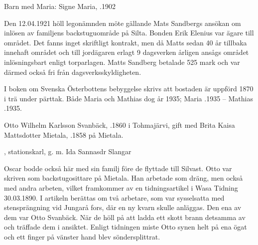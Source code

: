 Barn med Maria: Signe Maria, .1902

Den 12.04.1921 höll legonämnden möte gällande Mats Sandbergs ansökan om inlösen av familjens backstuguområde på Silta. Bonden Erik Elenius var ägare till området. Det fanns inget skriftligt kontrakt, men då Matts sedan 40 år tillbaka innehaft området och till jordägaren erlagt 9 dagsverken årligen ansågs området inlösningsbart enligt torparlagen. Matts Sandberg betalade 525 mark och var därmed också fri från dagsverksskyldigheten.

I boken om Svenska Österbottens bebyggelse skrivs att bostaden är uppförd 1870 i trä under pärttak. Både Maria och Mathias dog år 1935; Maria .1935  --  Mathias .1935.





Otto Wilhelm Karlsson Svanbäck, .1860 i Tohmajärvi, gift med Brita Kaisa Mattsdotter Mietala, .1858 på Mietala.
\begin{jhchildren}
  \item {}
  \item {}
  \item {}
  \item {}
  \item {}, stationskarl, g. m. Ida Sannasdr Slangar
  \item {}
  \item {}
  \item {}
  \item {}
\end{jhchildren}

Oscar bodde också här med sin familj före de flyttade till Silvast. Otto var skriven som backstugosittare på Mietala. Han arbetade som dräng, men också med andra arbeten, vilket framkommer av en tidningsartikel i Wasa Tidning 30.03.1890. I artikeln berättas om två arbetare, som var sysselsatta med stensprängning vid Jungarå fors, där en ny kvarn skulle anläggas. Den ena av dem var Otto Svanbäck. När de höll på att ladda ett skott brann detsamma av och träffade dem i ansiktet. Enligt tidningen miste Otto synen helt på ena ögat och ett finger på vänster hand blev söndersplittrat.

